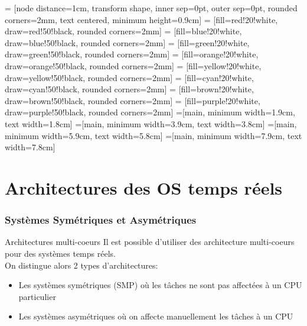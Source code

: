 %
%
%

     = [node distance=1cm, transform shape, inner sep=0pt, outer sep=0pt, rounded corners=2mm, text centered, minimum height=0.9cm]
     = [fill=red!20!white,     draw=red!50!black,     rounded corners=2mm]
    = [fill=blue!20!white,    draw=blue!50!black,    rounded corners=2mm]
   = [fill=green!20!white,   draw=green!50!black,   rounded corners=2mm]
  = [fill=orange!20!white,  draw=orange!50!black,  rounded corners=2mm]
  = [fill=yellow!20!white,  draw=yellow!50!black,  rounded corners=2mm]
    = [fill=cyan!20!white,    draw=cyan!50!black,    rounded corners=2mm]
   = [fill=brown!20!white,   draw=brown!50!black,   rounded corners=2mm]
  = [fill=purple!20!white,  draw=purple!50!black,  rounded corners=2mm]
=[main, minimum width=1.9cm, text width=1.8cm]
=[main, minimum width=3.9cm, text width=3.8cm]
=[main, minimum width=5.9cm, text width=5.8cm]
=[main, minimum width=7.9cm, text width=7.8cm]

\part{Architectures des OS temps réels}

\begin{frame}
\partpage
\end{frame}

\begin{frame}
\tableofcontents
\end{frame}

\section{Systèmes Symétriques et Asymétriques}

\begin{frame}{Architectures multi-coeurs}
  Il est  possible d'utiliser  des architecture multi-coeurs  pour des
  systèmes temps réels.
  \\
  On distingue alors 2 types d'architectures:
  \begin{itemize}
  \item  Les systèmes  symétriques (SMP)  où  les tâches  ne sont  pas
    affectées à un CPU particulier
  \item  Les  systèmes asymétriques  où  on  affecte manuellement  les
    tâches à un CPU
  \end{itemize}
\end{frame}

